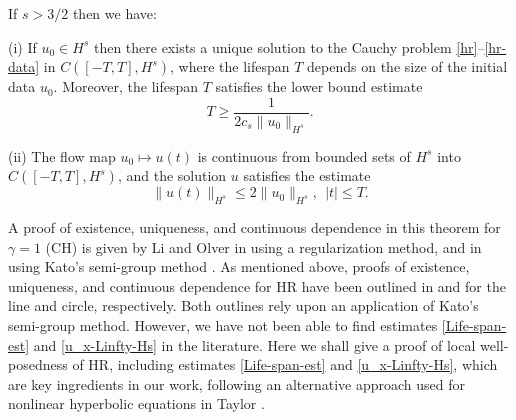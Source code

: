 %
%
%
%
%
%
\begin{theorem}
\label{thm:HR_existence_continuous_dependence}
If   $s>3/2$  then we have:

(i) If $u_0\in H^s$  then  there exists a unique solution to
the Cauchy problem  \eqref{hr}--\eqref{hr-data} in $C([-T, T], H^s)$, where 
the lifespan  $T$ depends on the size
of the initial data $u_0$. Moreover, 
the  lifespan $T$ satisfies the lower bound estimate 
%
%
%
\begin{equation}
\label{Life-span-est}
T
\ge
\frac{1}{2c_s \|u_0\|_{H^s}}.
\end{equation}
%

(ii)
The flow map $u_0 \mapsto u(t)$ is continuous from
bounded sets of $H^s$ into \\ $C([-T, T], H^s)$,
and the solution $u$ satisfies the estimate
%
%
%
\begin{equation}
\label{u_x-Linfty-Hs}
\|
u(t)
\|_ {H^s}
\le
2
\|
u_0
\|_{H^s}, \ \ |t|\le T.
\end{equation}
%
%
%
\end{theorem}
%
%
A proof of existence, uniqueness, and continuous dependence in this 
theorem for $\gamma =1$ (CH) 
is given  by Li and Olver in 
\cite{Li_2000_Well-posedness-} using a regularization method, and in
\cite{Rodriguez-Blanco_2001_On-the-Cauchy-p} using 
Kato's semi-group method \cite{Kato:1975}. As mentioned 
above, proofs of 
existence, uniqueness, and continuous dependence for  HR
have been outlined in \cite{Yin_2003_On-the-Cauchy-p} and 
\cite{Zhou_2005_Local-well-pose} for the line and circle, 
respectively. Both outlines rely upon an application of Kato's semi-group 
method. However, we have not been able to find estimates  
\eqref{Life-span-est} and \eqref{u_x-Linfty-Hs}  in the literature.
Here we shall give a proof of local well-posedness of HR,
including  estimates \eqref{Life-span-est} and \eqref{u_x-Linfty-Hs},
which are key ingredients in our work, 
following an alternative approach used for nonlinear hyperbolic equations
in Taylor \cite{Taylor:1991}.

